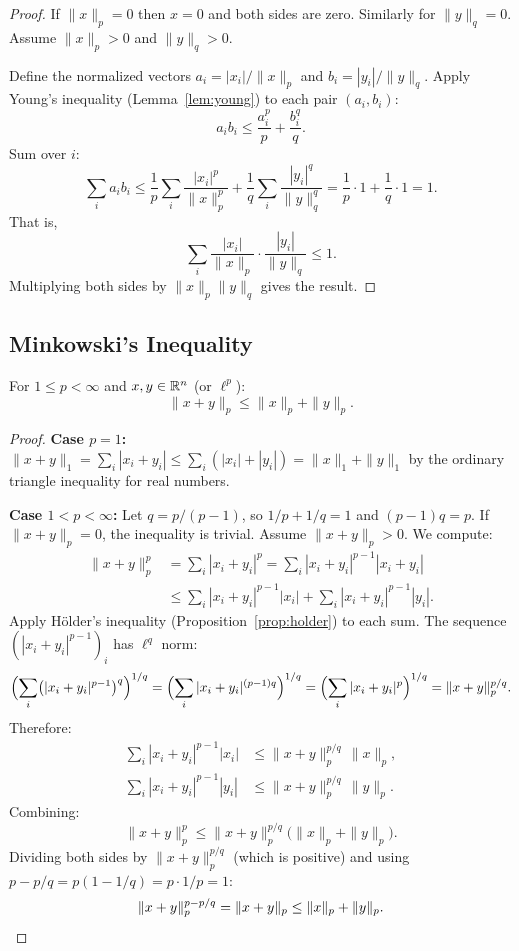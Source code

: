 \documentclass[11pt,a4paper]{article}
\begin{document}
\begin{proof}
If $\|x\|_p = 0$ then $x = 0$ and both sides are zero. Similarly for
$\|y\|_q = 0$. Assume $\|x\|_p > 0$ and $\|y\|_q > 0$.

Define the normalized vectors $a_i = |x_i| / \|x\|_p$ and
$b_i = |y_i| / \|y\|_q$. Apply Young's inequality
(Lemma~\ref{lem:young}) to each pair $(a_i, b_i)$:
\[
a_i b_i \le \frac{a_i^p}{p} + \frac{b_i^q}{q}.
\]
Sum over $i$:
\[
\sum_i a_i b_i
\le \frac{1}{p} \sum_i \frac{|x_i|^p}{\|x\|_p^p}
  + \frac{1}{q} \sum_i \frac{|y_i|^q}{\|y\|_q^q}
= \frac{1}{p} \cdot 1 + \frac{1}{q} \cdot 1
= 1.
\]
That is,
\[
\sum_i \frac{|x_i|}{\|x\|_p} \cdot \frac{|y_i|}{\|y\|_q} \le 1.
\]
Multiplying both sides by $\|x\|_p \|y\|_q$ gives the result.
\end{proof}

\subsection{Minkowski's Inequality}

\begin{proposition}
\label{prop:minkowski}
For $1 \le p < \infty$ and $x, y \in \mathbb{R}^n$ (or $\ell^p$):
\[
\|x + y\|_p \le \|x\|_p + \|y\|_p.
\]
\end{proposition}

\begin{proof}
\textbf{Case $p = 1$:} $\|x+y\|_1 = \sum_i |x_i + y_i| \le
\sum_i (|x_i| + |y_i|) = \|x\|_1 + \|y\|_1$ by the ordinary triangle
inequality for real numbers.

\textbf{Case $1 < p < \infty$:} Let $q = p/(p-1)$, so $1/p + 1/q = 1$ and
$(p-1)q = p$. If $\|x+y\|_p = 0$, the inequality is trivial. Assume
$\|x+y\|_p > 0$. We compute:
\begin{align*}
\|x + y\|_p^p
&= \sum_i |x_i + y_i|^p
= \sum_i |x_i + y_i|^{p-1} |x_i + y_i| \\
&\le \sum_i |x_i + y_i|^{p-1} |x_i|
  + \sum_i |x_i + y_i|^{p-1} |y_i|.
\end{align*}
Apply H\"older's inequality (Proposition~\ref{prop:holder}) to each sum.
The sequence $(|x_i + y_i|^{p-1})_i$ has $\ell^q$ norm:
\[
\Bigl(\sum_i \bigl(|x_i + y_i|^{p-1}\bigr)^q\Bigr)^{1/q}
= \Bigl(\sum_i |x_i + y_i|^{(p-1)q}\Bigr)^{1/q}
= \Bigl(\sum_i |x_i + y_i|^p\Bigr)^{1/q}
= \|x+y\|_p^{p/q}.
\]
Therefore:
\begin{align*}
\sum_i |x_i + y_i|^{p-1} |x_i|
  &\le \|x+y\|_p^{p/q} \, \|x\|_p, \\
\sum_i |x_i + y_i|^{p-1} |y_i|
  &\le \|x+y\|_p^{p/q} \, \|y\|_p.
\end{align*}
Combining:
\[
\|x + y\|_p^p \le \|x + y\|_p^{p/q} \bigl(\|x\|_p + \|y\|_p\bigr).
\]
Dividing both sides by $\|x + y\|_p^{p/q}$ (which is positive) and using
$p - p/q = p(1 - 1/q) = p \cdot 1/p = 1$:
\[
\|x + y\|_p^{p - p/q} = \|x + y\|_p \le \|x\|_p + \|y\|_p. \qedhere
\]
\end{proof}
\end{document}
